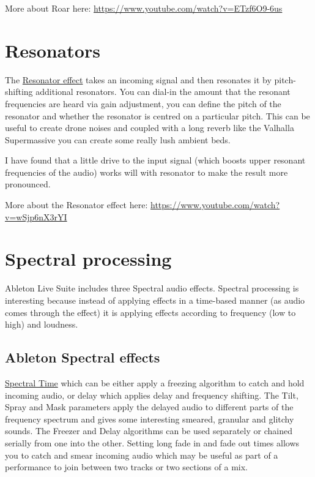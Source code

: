 \documentclass[
  12pt,
  letterpaper,
  oneside,
  open=any]{scrbook}
\makeatletter
\newcommand*\pandocbounded[1]{%
  \sbox\pandoc@box{#1}%
  \Gscale@div\@tempa{\textheight}{\dimexpr\ht\pandoc@box+\dp\pandoc@box\relax}%
  \Gscale@div\@tempb{\linewidth}{\wd\pandoc@box}%
  \ifdim\@tempb\p@<\@tempa\p@\let\@tempa\@tempb\fi%
  \ifdim\@tempa\p@<\p@\scalebox{\@tempa}{\usebox\pandoc@box}%
  \else\usebox{\pandoc@box}%
  \fi%
}
\makeatother
\begin{document}
More about Roar here: \url{https://www.youtube.com/watch?v=ETzf6O9-6us}

\section{Resonators}\label{resonators}

The
\href{https://www.ableton.com/en/live-manual/11/live-audio-effect-reference/\#resonators}{Resonator
effect} takes an incoming signal and then resonates it by pitch-shifting
additional resonators. You can dial-in the amount that the resonant
frequencies are heard via gain adjustment, you can define the pitch of
the resonator and whether the resonator is centred on a particular
pitch. This can be useful to create drone noises and coupled with a long
reverb like the Valhalla Supermassive you can create some really lush
ambient beds.

I have found that a little drive to the input signal (which boosts upper
resonant frequencies of the audio) works will with resonator to make the
result more pronounced.

\pandocbounded{\texttt{[image: images/Resonator.png]}}

More about the Resonator effect here:
\url{https://www.youtube.com/watch?v=wSjp6nX3rYI}

\section{Spectral processing}\label{spectral-processing}

Ableton Live Suite includes three Spectral audio effects. Spectral
processing is interesting because instead of applying effects in a
time-based manner (as audio comes through the effect) it is applying
effects according to frequency (low to high) and loudness.

\subsection{Ableton Spectral effects}\label{ableton-spectral-effects}

\href{https://www.ableton.com/en/live-manual/11/live-audio-effect-reference/\#spectral-time}{Spectral
Time} which can be either apply a freezing algorithm to catch and hold
incoming audio, or delay which applies delay and frequency shifting. The
Tilt, Spray and Mask parameters apply the delayed audio to different
parts of the frequency spectrum and gives some interesting smeared,
granular and glitchy sounds. The Freezer and Delay algorithms can be
used separately or chained serially from one into the other. Setting
long fade in and fade out times allows you to catch and smear incoming
audio which may be useful as part of a performance to join between two
tracks or two sections of a mix.
\end{document}
